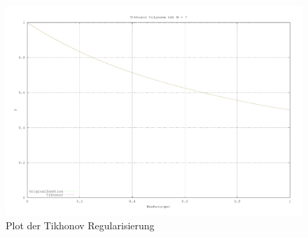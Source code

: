 \begin{figure}[H]
    \vspace{-1em}
    \begin{center}
        \includegraphics[width=\textwidth]{img/tikhonov.pdf}
    \end{center}
    \vspace{-1em}
    \caption{Plot der Tikhonov Regularisierung}
    \label{fig:Tikonov}
\end{figure}